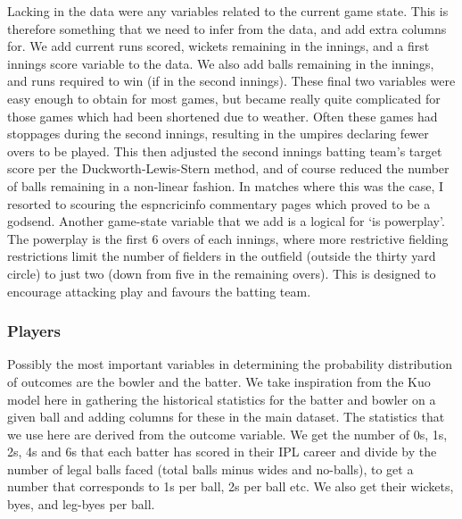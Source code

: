 Lacking in the data were any variables related to the current game state. This is therefore something that we need to infer from the data, and add extra columns for. We add current runs scored, wickets remaining in the innings, and a first innings score variable to the data. We also add balls remaining in the innings, and runs required to win (if in the second innings). These final two variables were easy enough to obtain for most games, but became really quite complicated for those games which had been shortened due to weather. Often these games had stoppages during the second innings, resulting in the umpires declaring fewer overs to be played. This then adjusted the second innings batting team’s target score per the Duckworth-Lewis-Stern method, and of course reduced the number of balls remaining in a non-linear fashion. In matches where this was the case, I resorted to scouring the espncricinfo commentary pages \cite{noauthor_live_nodate} which proved to be a godsend. Another game-state variable that we add is a logical for ‘is powerplay’. The powerplay is the first 6 overs of each innings\footnotemark{}, where more restrictive fielding restrictions limit the number of fielders in the outfield (outside the thirty yard circle) to just two (down from five in the remaining overs). This is designed to encourage attacking play and favours the batting team.


\subsubsection{Players}

Possibly the most important variables in determining the probability distribution of outcomes are the bowler and the batter. We take inspiration from the Kuo model here in gathering the historical statistics for the batter and bowler on a given ball and adding columns for these in the main dataset. The statistics that we use here are derived from the outcome variable. We get the number of 0s, 1s, 2s, 4s and 6s\footnotemark{} that each batter has scored in their IPL career and divide by the number of legal balls faced (total balls minus wides and no-balls), to get a number that corresponds to 1s per ball, 2s per ball etc. We also get their wickets, byes, and leg-byes per ball.


